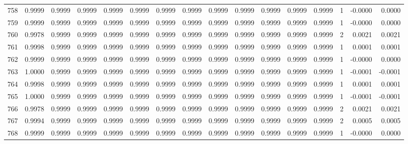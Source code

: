 \begin{tabular}{lrrrrrrrrrrrrrrr}
758 &      0.9999 &  0.9999 &  0.9999 &  0.9999 &  0.9999 &  0.9999 &  0.9999 &  0.9999 &  0.9999 &  0.9999 &   0.9999 &     0.9999 &      1 &                   -0.0000 &                     0.0000 \\
759 &      0.9999 &  0.9999 &  0.9999 &  0.9999 &  0.9999 &  0.9999 &  0.9999 &  0.9999 &  0.9999 &  0.9999 &   0.9999 &     0.9999 &      1 &                   -0.0000 &                     0.0000 \\
760 &      0.9978 &  0.9999 &  0.9999 &  0.9999 &  0.9999 &  0.9999 &  0.9999 &  0.9999 &  0.9999 &  0.9999 &   0.9999 &     0.9999 &      2 &                    0.0021 &                     0.0021 \\
761 &      0.9998 &  0.9999 &  0.9999 &  0.9999 &  0.9999 &  0.9999 &  0.9999 &  0.9999 &  0.9999 &  0.9999 &   0.9999 &     0.9999 &      1 &                    0.0001 &                     0.0001 \\
762 &      0.9999 &  0.9999 &  0.9999 &  0.9999 &  0.9999 &  0.9999 &  0.9999 &  0.9999 &  0.9999 &  0.9999 &   0.9999 &     0.9999 &      1 &                   -0.0000 &                     0.0000 \\
763 &      1.0000 &  0.9999 &  0.9999 &  0.9999 &  0.9999 &  0.9999 &  0.9999 &  0.9999 &  0.9999 &  0.9999 &   0.9999 &     0.9999 &      1 &                   -0.0001 &                    -0.0001 \\
764 &      0.9998 &  0.9999 &  0.9999 &  0.9999 &  0.9999 &  0.9999 &  0.9999 &  0.9999 &  0.9999 &  0.9999 &   0.9999 &     0.9999 &      1 &                    0.0001 &                     0.0001 \\
765 &      1.0000 &  0.9999 &  0.9999 &  0.9999 &  0.9999 &  0.9999 &  0.9999 &  0.9999 &  0.9999 &  0.9999 &   0.9999 &     0.9999 &      1 &                   -0.0001 &                    -0.0001 \\
766 &      0.9978 &  0.9999 &  0.9999 &  0.9999 &  0.9999 &  0.9999 &  0.9999 &  0.9999 &  0.9999 &  0.9999 &   0.9999 &     0.9999 &      2 &                    0.0021 &                     0.0021 \\
767 &      0.9994 &  0.9999 &  0.9999 &  0.9999 &  0.9999 &  0.9999 &  0.9999 &  0.9999 &  0.9999 &  0.9999 &   0.9999 &     0.9999 &      2 &                    0.0005 &                     0.0005 \\
768 &      0.9999 &  0.9999 &  0.9999 &  0.9999 &  0.9999 &  0.9999 &  0.9999 &  0.9999 &  0.9999 &  0.9999 &   0.9999 &     0.9999 &      1 &                   -0.0000 &                     0.0000 \\

\end{tabular}
